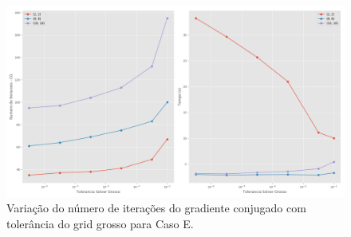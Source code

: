 \begin{figure}[!htbp]
\centering
\includegraphics[width=\textwidth]{chap08/figs/Acuracia93MM.png}
\caption{ Variação do número de iterações do gradiente conjugado com tolerância do grid grosso para Caso E.}
\label{fig:toleranciaGrossa}
\end{figure}


